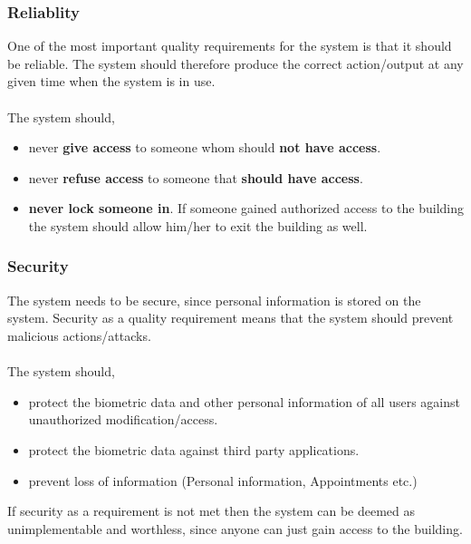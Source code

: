 \subsubsection{Reliablity}
One of the most important quality requirements for the system is that it should be reliable.
The system should therefore produce the correct action/output at any given time when the system is in use.\\
\\The system should,
\begin{itemize}
	\item  never \textbf{give access} to someone whom should \textbf{not have access}.
	\item  never \textbf{refuse access} to someone that\textbf{ should have access}. 
	\item  \textbf{never lock someone in}. If someone gained authorized access to the building the system should 				allow him/her to exit the building as well.
\end{itemize}

\subsubsection{Security}
The system needs to be secure, since personal information is stored on the system. Security as a quality requirement means that the system should prevent malicious actions/attacks.\\
\\The system should,
\begin{itemize}
	\item  protect the biometric data and other personal information of all users against unauthorized modification/access.
	\item  protect the biometric data against third party applications.
	\item  prevent loss of information (Personal information, Appointments etc.)
\end{itemize}

If security as a requirement is not met then the system can be deemed as unimplementable and worthless, since anyone can just gain access to the building.

